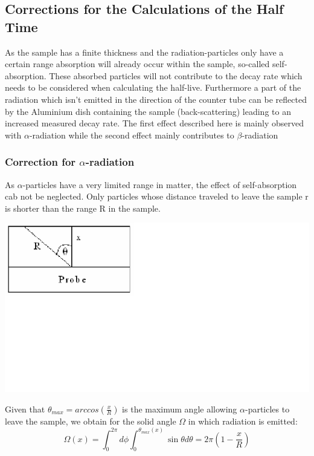 \documentclass[12pt]{article}
\begin{document}
 
 

 \subsection{Corrections for the Calculations of the Half Time}
 
 As the sample has a finite thickness and the radiation-particles only have a certain range absorption will already occur within the sample, so-called self-absorption. These absorbed particles will not contribute to the decay rate which needs to be considered when calculating the half-live. Furthermore a part of the radiation which isn't emitted in the direction of the counter tube can be reflected by the Aluminium dish containing the sample (back-scattering) leading to an increased measured decay rate.
The first effect described here is mainly observed with $\alpha$-radiation while the second effect mainly contributes to $\beta$-radiation


\subsubsection{Correction for $\alpha$-radiation}

As $\alpha$-particles have a very limited range in matter, the effect of self-absorption cab not be neglected. Only particles whose distance traveled to leave the sample r is shorter than the range R in the sample. 

%
\vskip0.5cm
\begin{minipage}{\textwidth}
	\centering
	\includegraphics[width=.3\textwidth]{figures/alpha-Korrektur.png}
\end{minipage}
\vskip0.5cm
Given that $\theta_{max}=arccos\left( \frac{x}{R}\right)$   is the maximum angle allowing $\alpha$-particles to leave the sample, we obtain for the 
solid angle $\Omega$ in which radiation is emitted:
\[\Omega(x)=\int_{0}^{2\pi}d\phi\int_{0}^{\theta_{max}(x)}\sin\theta d\theta = 2\pi\left( 1-\frac{x}{R}\right)\]
\end{document}
